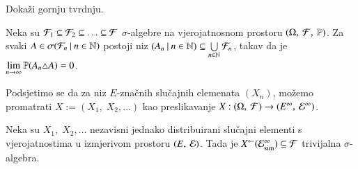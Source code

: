 \begin{nap} %
    Doka\v zi gornju tvrdnju.
\end{nap}

\begin{zad} \label{zad:9.10}
    Neka su $\mathcal{F}_1 \subseteq \mathcal{F}_2 \subseteq \ldots \subseteq \mathcal{F}$ $\sigma$-algebre na vjerojatnosnom prostoru $(\Omega, \: \mathcal{F}, \: \mathbb{P})$.
    Za svaki $A \in \sigma({\mathcal{F}_n} \: | \: {n \in \mathbb{N}})$ postoji niz $({A_n} \: | \: {n \in \mathbb{N}}) \subseteq \bigcup\limits_{n \in \mathbb{N}}^{} \mathcal{F}_n$, takav da je $\lim\limits_{n \to \infty} \mathbb{P}({A_n \triangle A}) = 0$.
\end{zad}

Podsjetimo se da za niz $E$-zna\v cnih slu\v cajnih elemenata $(X_n)$, mo\v zemo promatrati $X:=(X_1, \; X_2, \ldots)$ kao preslikavanje
$X: ({\Omega}, \: {\mathcal{F}}) \to ({E^\infty}, \: {\mathcal{E}^\infty})$.

\begin{tm}    \label{tm:9.11}
    Neka su $X_1, \; X_2, \ldots$ nezavisni jednako distribuirani slu\v cajni elementi s vjerojatnostima u izmjerivom prostoru $({E}, \: {\mathcal{E}})$.
    Tada je  ${X}^{\leftarrow}(\mathcal{E}_{\mathrm{sim}}^\infty) \subseteq \mathcal{F}$ trivijalna $\sigma$-algebra.
\end{tm}

